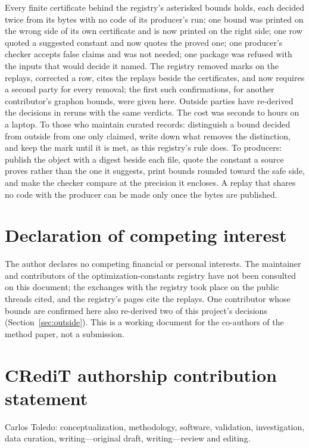 \documentclass[preprint,11pt,authoryear,a4paper]{elsarticle}
\begin{document}
Every finite certificate behind the registry's asterisked bounds holds, each decided twice from its bytes with no code of its producer's run; one bound was printed on the wrong side of its own certificate and is now printed on the right side; one row quoted a suggested constant and now quotes the proved one; one producer's checker accepts false claims and was not needed; one package was refused with the inputs that would decide it named. The registry removed \MtRgMarksTotalWord{} marks on the replays, corrected a row, cites the replays beside the certificates, and now requires a second party for every removal; the first such confirmations, for another contributor's graphon bounds, were given here. Outside parties have re-derived the decisions in \OcOutRuns{} reruns with the same verdicts. The cost was seconds to hours on a laptop. To those who maintain curated records: distinguish a bound decided from outside from one only claimed, write down what removes the distinction, and keep the mark until it is met, as this registry's rule does. To producers: publish the object with a digest beside each file, quote the constant a source proves rather than the one it suggests, print bounds rounded toward the safe side, and make the checker compare at the precision it encloses. A replay that shares no code with the producer can be made only once the bytes are published.

\section*{Declaration of competing interest}
The author declares no competing financial or personal interests. The maintainer and contributors of the optimization-constants registry have not been consulted on this document; the exchanges with the registry took place on the public threads cited, and the registry's pages cite the replays. One contributor whose bounds are confirmed here also re-derived two of this project's decisions (Section~\ref{sec:outside}). This is a working document for the co-authors of the method paper, not a submission.

\section*{CRediT authorship contribution statement}
Carlos Toledo: conceptualization, methodology, software, validation, investigation, data curation, writing---original draft, writing---review and editing.
\end{document}
